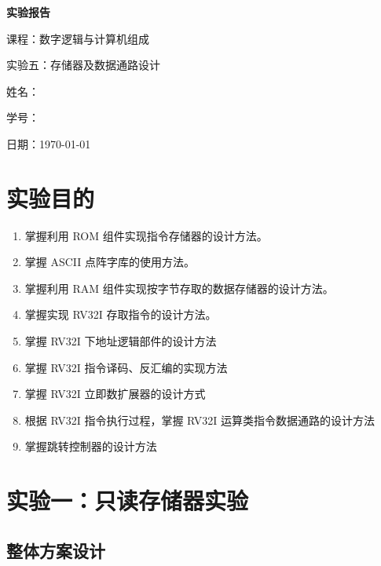 \documentclass[12pt, a4paper]{ctexart}
\begin{document}
\begin{titlepage}
    \centering
    \vspace*{5cm}
    {\Huge\bfseries 实验报告\par}
    \vspace{2cm}
    {\Large 课程：数字逻辑与计算机组成\par}
    \vspace{1cm}
    {\Large 实验五：存储器及数据通路设计\par}
    \vspace{4cm}
    {\large 姓名：\underline{}\par}
    \vspace{1cm}
    {\large 学号：\underline{}\par}
    \vspace{1cm}
    {\large 日期：\today\par}
\end{titlepage}

\tableofcontents
\enlargethispage{\baselineskip}
\newpage

\section{实验目的}

\begin{enumerate}
    \item 掌握利用 ROM 组件实现指令存储器的设计方法。
    \item 掌握 ASCII 点阵字库的使用方法。
    \item 掌握利用 RAM 组件实现按字节存取的数据存储器的设计方法。
    \item 掌握实现 RV32I 存取指令的设计方法。
    \item 掌握 RV32I 下地址逻辑部件的设计方法
    \item 掌握 RV32I 指令译码、反汇编的实现方法
    \item 掌握 RV32I 立即数扩展器的设计方式
    \item 根据 RV32I 指令执行过程，掌握 RV32I 运算类指令数据通路的设计方法
    \item 掌握跳转控制器的设计方法
\end{enumerate}

\section{实验一：只读存储器实验}

\subsection{整体方案设计}
\end{document}
